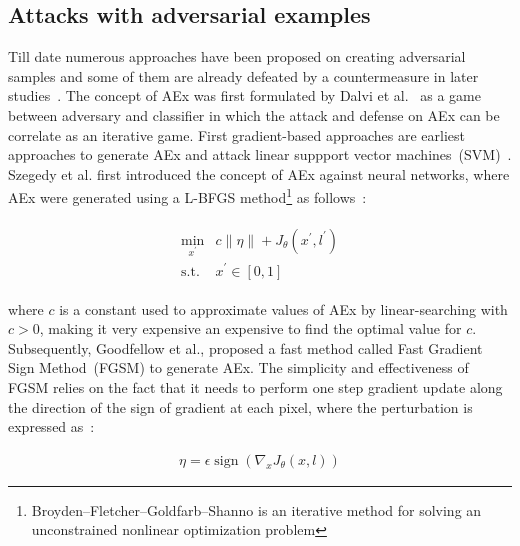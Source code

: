 \subsection{Attacks with adversarial examples}
Till date numerous approaches have been proposed on creating adversarial samples and some of them are already defeated by a countermeasure in later studies~\cite{yuan2019adversarial}. The concept of AEx was first formulated by Dalvi et al.~\cite{dalvi2004adversarial} as a game between adversary and classifier in which the attack and defense on AEx can be correlate as an iterative game. First gradient-based approaches are earliest approaches to generate AEx and attack linear suppport vector machines~(SVM)~\cite{biggio2013evasion}. Szegedy et al.\cite{szegedy2013intriguing} first introduced the concept of AEx against neural networks, where AEx were generated using a L-BFGS method\footnote{ Broyden–Fletcher–Goldfarb–Shanno is an iterative method for solving an unconstrained nonlinear optimization problem} as follows~\cite{yuan2019adversarial}:

\vspace{-6mm}
\begin{align}
    \begin{array}{cl}
        \min _{x^{\prime}} & c\|\eta\|+J_{\theta}\left(x^{\prime}, l^{\prime}\right) \\
         \text {s.t.} & x^{\prime} \in[0,1]
    \end{array}
    \label{eq:fgsm_aex}
\end{align}

\hspace*{3.5mm} where $c$ is a constant used to approximate values of AEx by linear-searching with $c > 0$, making it very expensive an expensive to find the optimal value for $c$. Subsequently, Goodfellow et al.\cite{goodfellow2014explaining}, proposed a fast method called Fast Gradient Sign Method~(FGSM) to generate AEx. The simplicity and effectiveness of FGSM relies on the fact that it needs to perform one step gradient update along the direction of the sign of gradient at each pixel, where the perturbation is expressed as~\cite{goodfellow2014explaining}: 

\vspace{-6mm}
\begin{align}
    \eta=\epsilon \operatorname{sign}\left(\nabla_{x} J_{\theta}(x, l)\right)
    \label{eq:fgsm_eta}
\end{align}

